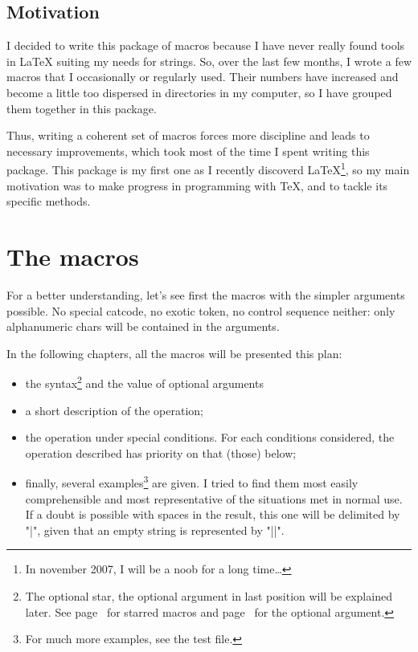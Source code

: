 \documentclass[a4paper,10pt]{article}
\newcommand\guill[1]{"#1"}
\begin{document}
\subsection{Motivation}
I decided to write this package of macros because I have never really found tools in \LaTeX{} suiting my needs for strings. So, over the last few months, I wrote a few macros that I occasionally or regularly used. Their numbers have increased and become a little too dispersed in directories in my computer, so I have grouped them together in this package.

Thus, writing a coherent set of macros forces more discipline and leads to necessary improvements, which took most of the time I spent writing this package. This package is my first one as I recently discoverd \LaTeX{}\footnote{In november 2007, I will be a noob for a long time\ldots}, so my main motivation was to make progress in programming with \TeX, and to tackle its specific methods.

\section{The macros}
For a better understanding, let's see first the macros with the simpler arguments possible. No special catcode, no exotic token, no control sequence neither: only alphanumeric chars will be contained in the arguments.\medskip

In the following chapters, all the macros will be presented this plan:
\begin{itemize}
	\item the syntax\footnote{The optional star, the optional argument in last position will be explained later. See page~\pageref{macrosetoilees} for starred macros and  page~\pageref{argumentoptionnel} for the optional argument.} and the value of optional arguments
	\item a short description of the operation;
	\item the operation under special conditions. For each conditions considered, the operation described has priority on that (those) below;
	\item finally, several examples\footnote{For much more examples, see the test file.} are given. I tried to find them most easily comprehensible and most representative of the situations met in normal use. If a doubt is possible with spaces in the result, this one will be delimited by \guill{|}, given that an empty string is represented by \guill{||}.
\end{itemize}\smallskip
\end{document}
